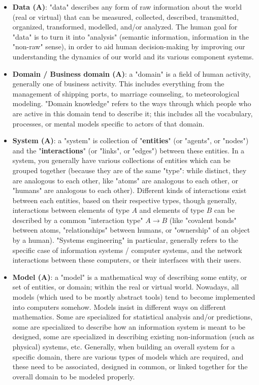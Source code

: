 \documentclass{article}
\begin{document}
\begin{itemize}
	\item \textbf{Data (A)}: "data" describes any form of raw information about the world (real or virtual) that can be measured, collected, described, transmitted, organized, transformed, modelled, and/or analyzed. The human goal for "data" is to turn it into "analysis" (semantic information, information in the "non-raw" sense), in order to aid human decision-making by improving our understanding the dynamics of our world and its various component systems.

	\item \textbf{Domain / Business domain (A)}: a "domain" is a field of human activity, generally one of business activity. This includes everything from the management of shipping ports, to marriage counseling, to meteorological modeling. "Domain knowledge" refers to the ways through which people who are active in this domain tend to describe it; this includes all the vocabulary, processes, or mental models specific to actors of that domain.

	\item \textbf{System (A)}: a "system" is collection of "\textbf{entities}" (or "agents", or "nodes") and the "\textbf{interactions}" (or "links", or "edges") between these entities. In a system, you generally have various collections of entities which can be grouped together (because they are of the same "type": while distinct, they are analogous to each other, like "atoms" are analogous to each other, or "humans" are analogous to each other). Different kinds of interactions exist between each entities, based on their respective types, though generally, interactions between elements of type $A$ and elements of type $B$ can be described by a common "interaction type" $A \to B$ (like "covalent bonds" between atoms, "relationships" between humans, or "ownership" of an object by a human). "Systems engineering" in particular, generally refers to the specific case of information systems / computer systems, and the network interactions between these computers, or their interfaces with their users.

	\item \textbf{Model (A)}: a "model" is a mathematical way of describing some entity, or set of entities, or domain; within the real or virtual world. Nowadays, all models (which used to be mostly abstract tools) tend to become implemented into computers somehow. Models insist in different ways on different mathematics. Some are specialized for statistical analysis and/or predictions, some are specialized to describe how an information system is meant to be designed, some are specialized in describing existing non-information (such as physical) systems, etc. Generally, when building an overall system for a specific domain, there are various types of models which are required, and these need to be associated, designed in common, or linked together for the overall domain to be modeled properly.


\end{itemize}
\end{document}
